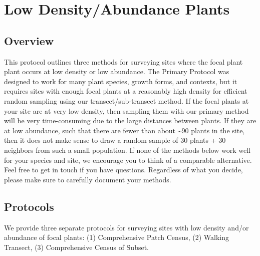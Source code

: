 \documentclass[
  letterpaper,
  DIV=11,
  numbers=noendperiod]{scrreprt}
\begin{document}
\begin{figure}
\begin{minipage}{0.50\linewidth}
{}


\end{minipage}%

\end{figure}%

\chapter{Low Density/Abundance Plants}\label{sec-low_density}

\section{Overview}\label{overview-1}

This protocol outlines three methods for surveying sites where the focal
plant plant occurs at low density or low abundance. The Primary Protocol
was designed to work for many plant species, growth forms, and contexts,
but it requires sites with enough focal plants at a reasonably high
density for efficient random sampling using our transect/sub-transect
method. If the focal plants at your site are at very low density, then
sampling them with our primary method will be very time-consuming due to
the large distances between plants. If they are at low abundance, such
that there are fewer than about \textasciitilde90 plants in the site,
then it does not make sense to draw a random sample of 30 plants + 30
neighbors from such a small population. If none of the methods below
work well for your species and site, we encourage you to think of a
comparable alternative. Feel free to get in touch if you have questions.
Regardless of what you decide, please make sure to carefully document
your methods.

\section{Protocols}\label{protocols-1}

We provide three separate protocols for surveying sites with low density
and/or abundance of focal plants: (1) Comprehensive Patch Census, (2)
Walking Transect, (3) Comprehensive Census of Subset.
\end{document}
